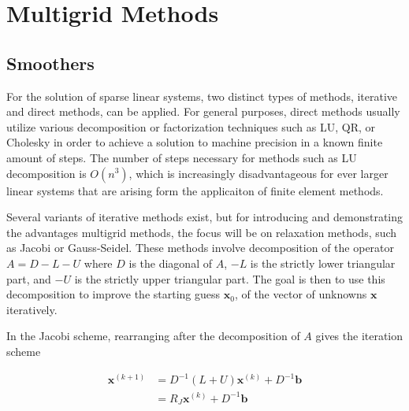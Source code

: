 
\chapter{Multigrid Methods}
\label{chapter:MultigridMethods}

\section{Smoothers}



For the solution of sparse linear systems, two distinct types of methods, iterative and direct methods, can be applied. For general purposes, direct methods usually utilize various decomposition or factorization techniques such as LU, QR, or Cholesky in order to achieve a solution to machine precision in a known finite amount of steps. The number of steps necessary for methods such as LU decomposition is $O(n^3)$, which is increasingly disadvantageous for ever larger linear systems that are arising form the applicaiton of finite element methods.

Several variants of iterative methods exist, but for introducing and demonstrating the advantages multigrid methods, the focus will be on relaxation methods, such as Jacobi or Gauss-Seidel. These methods involve decomposition of the operator $A = D - L - U$ where $D$ is the diagonal of $A$, $-L$ is the strictly lower triangular part, and $-U$ is the strictly upper triangular part. The goal is then to use this decomposition to improve the starting guess $\mathbf{x}_{0}$, of the vector of unknowns $\mathbf{x}$ iteratively.

In the Jacobi scheme, rearranging after the decomposition of $A$ gives the iteration scheme

\begin{equation}
	\begin{aligned}
	\mathbf{x}^{(k+1)} &= D^{-1}(L + U)\mathbf{x}^{(k)} + D^{-1}\mathbf{b} \\
	                   &= R_J\mathbf{x}^{(k)} + D^{-1} \mathbf{b}
	\end{aligned}
\end{equation}

